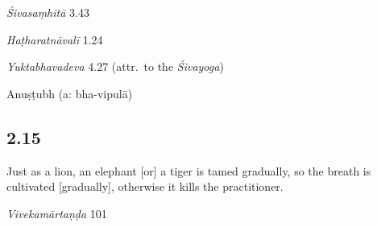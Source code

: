 \begin{ekdosis}
\begin{sources}[hp02_014]
\emph{Śivasaṃhitā} 3.43

\begin{versinnote}
\end{versinnote}
\end{sources}

\begin{testimonia}[hp02_014]
\emph{Haṭharatnāvalī} 1.24

\begin{versinnote}
\end{versinnote}

\emph{Yuktabhavadeva} 4.27 (attr.~to the \emph{Śivayoga})
\begin{versinnote}
\end{versinnote}

\end{testimonia}

\begin{philcomm}[hp02_014]
\end{philcomm}

\begin{metre}[hp02_014]
Anuṣṭubh (a: bha-vipulā)
\end{metre}

\subsection*{2.15}
\begin{translation}[hp02_015]
Just as a lion, an elephant [or] a tiger is tamed gradually, so the breath is cultivated [gradually], otherwise it kills the practitioner.
\end{translation}

\begin{sources}[hp02_015]
\emph{Vivekamārtaṇḍa} 101

\begin{versinnote}
\end{versinnote}
\end{sources}


\end{ekdosis}
